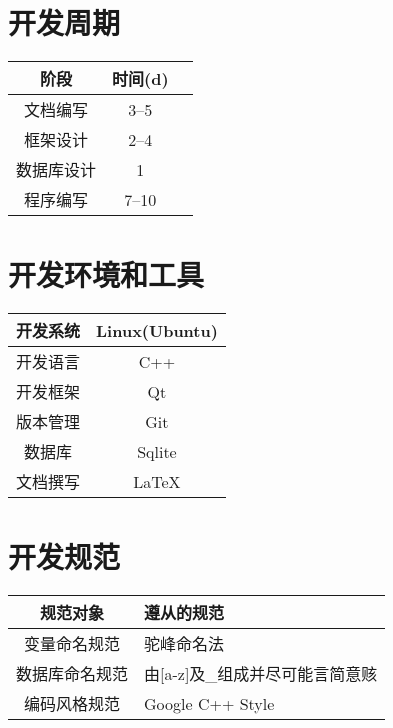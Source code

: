 \section{开发周期}
	\begin{tabular}{|c|c|c|}
	    \hline
	    阶段 & 时间(d)  \\
	    \hline
	    文档编写 & 3--5 \\
	    \hline
	    框架设计 & 2--4 \\
	    \hline
	    数据库设计 & 1 \\
	    \hline
	    程序编写 & 7--10 \\
	    \hline
	\end{tabular}
\section{开发环境和工具}
	\begin{tabular}{|c|c|}
	    \hline
	    开发系统 & Linux(Ubuntu) \\
	    \hline
	    开发语言 & C++ \\
	    \hline
	    开发框架 & Qt \\
	    \hline
	    版本管理 & Git \\
	    \hline
	    数据库 & Sqlite \\
	    \hline
	    文档撰写 & \LaTeX \\
	    \hline
	\end{tabular}
\section{开发规范}
	\begin{tabular}{|c|p{3cm}|}
	    \hline
	    规范对象 & 遵从的规范 \\
	    \hline 
	    变量命名规范 & 驼峰命名法 \\
	    \hline
	    数据库命名规范 & 由[a-z]及\_组成并尽可能言简意赅 \\
	    \hline
	    编码风格规范 & Google C++ Style \\
	    \hline
	\end{tabular}